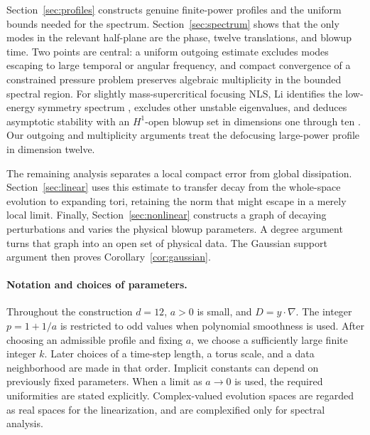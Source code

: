 \documentclass[11pt]{article}
\numberwithin{equation}{section}
\theoremstyle{definition}
\theoremstyle{remark}
\begin{document}
Section~\ref{sec:profiles} constructs genuine finite-power profiles and
the uniform bounds needed for the spectrum. Section~\ref{sec:spectrum}
shows that the only modes in the relevant half-plane are the phase,
twelve translations, and blowup time. Two points are central: a uniform
outgoing estimate excludes modes escaping to large temporal or angular
frequency, and compact convergence of a constrained pressure problem
preserves algebraic multiplicity in the bounded spectral region.
For slightly mass-supercritical focusing NLS, Li identifies the
low-energy symmetry spectrum \cite[Theorem~1.1]{Li2025Low}, excludes
other unstable eigenvalues, and deduces asymptotic stability with an
$H^1$-open blowup set in dimensions one through ten
\cite[Theorems~1.2--1.3]{Li2025High}. Our outgoing and multiplicity
arguments treat the defocusing large-power profile in dimension twelve.

The remaining analysis separates a local compact error from global
dissipation. Section~\ref{sec:linear} uses this estimate to transfer
decay from the whole-space evolution to expanding tori, retaining the
norm that might escape in a merely local limit. Finally,
Section~\ref{sec:nonlinear} constructs a graph of decaying perturbations
and varies the physical blowup parameters. A degree argument turns that
graph into an open set of physical data. The Gaussian support argument
then proves Corollary~\ref{cor:gaussian}.

\paragraph{Notation and choices of parameters.}
Throughout the construction $d=12$, $a>0$ is small, and
$D=y\cdot\nabla$. The integer $p=1+1/a$ is restricted to odd values
when polynomial smoothness is used. After choosing an admissible profile
and fixing $a$, we choose a sufficiently large finite integer $k$.
Later choices of a time-step length, a torus scale, and a data
neighborhood are made in that order. Implicit constants can depend on
previously fixed parameters. When a limit as $a\to0$ is used, the
required uniformities are stated explicitly. Complex-valued evolution
spaces are regarded as real spaces for the linearization, and are
complexified only for spectral analysis.







\appendix




\end{document}
